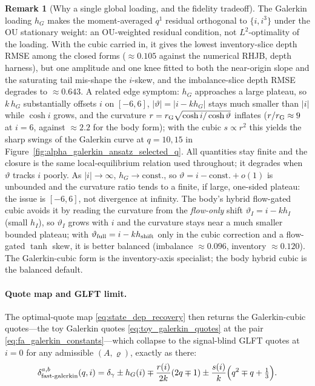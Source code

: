 \documentclass[11pt,a4paper]{article}
\theoremstyle{plain}
\theoremstyle{definition}
\newtheorem{remark}{Remark}[section]
\begin{document}
\begin{remark}[Why a single global loading, and the fidelity tradeoff]
\label{rem:fa_galerkin_tradeoff}
The Galerkin loading \(h_G\) makes the moment-averaged \(q^1\) residual
orthogonal to \(\{i,i^3\}\) under the OU stationary weight: an OU-weighted
residual condition, not \(L^2\)-optimality of the loading.  With the cubic
carried in, it gives the lowest inventory-slice depth RMSE among the closed
forms (\(\approx0.105\) against the numerical RHJB, depth harness), but one
amplitude and one knee fitted to both the near-origin slope and the saturating
tail mis-shape the \(i\)-skew, and the imbalance-slice depth RMSE degrades to
\(\approx0.643\).  A related edge symptom: \(h_G\) approaches a large plateau,
so \(k\,h_G\) substantially offsets \(i\) on \([-6,6]\),
\(|\vartheta|=|i-kh_G|\) stays much smaller than \(|i|\) while \(\cosh i\)
grows, and the curvature \(r=r_{\rm G}\sqrt{\cosh i/\cosh\vartheta}\) inflates
(\(r/r_{\rm G}\approx9\) at \(i=6\), against \(\approx2.2\) for the body
form); with the cubic \(s\propto r^2\) this yields the sharp swings of the
Galerkin curve at \(q=10,15\) in
Figure~\ref{fig:alpha_galerkin_ansatz_selected_q}.  All quantities stay finite
and the closure is the same local-equilibrium relation used throughout; it
degrades when \(\vartheta\) tracks \(i\) poorly.  As \(|i|\to\infty\),
\(h_G\to\mathrm{const.}\), so \(\vartheta=i-\mathrm{const.}+o(1)\) is
unbounded and the curvature ratio tends to a finite, if large, one-sided
plateau: the issue is \([-6,6]\), not divergence at infinity.  The body's
hybrid flow-gated cubic avoids it by reading the curvature from the
\emph{flow-only} shift \(\vartheta_I=i-kh_I\) (small \(h_I\)), so
\(\vartheta_I\) grows with \(i\) and the curvature stays near a much smaller
bounded plateau; with \(\vartheta_{\rm full}=i-kh_{\rm shift}\) only in the
cubic correction and a flow-gated \(\tanh\) skew, it is better balanced
(imbalance \(\approx0.096\), inventory \(\approx0.120\)).  The Galerkin-cubic
form is the inventory-axis specialist; the body hybrid cubic is the balanced
default.
\end{remark}

\paragraph{Quote map and GLFT limit.}
The optimal-quote map \eqref{eq:state_dep_recovery} then returns the
Galerkin-cubic quotes---the toy Galerkin quotes \eqref{eq:toy_galerkin_quotes}
at the pair \eqref{eq:fa_galerkin_constants}---which collapse to the
signal-blind GLFT quotes at \(i=0\) for any admissible \((A,\varrho)\),
exactly as there:
\begin{equation}
\delta_{\rm fast\text{-}galerkin}^{a,b}(q,i)
=\delta_\gamma\pm h_G(i)\mp\frac{r(i)}{2k}(2q\mp1)
\pm\frac{s(i)}{k}\Bigl(q^2\mp q+\tfrac13\Bigr).
\label{eq:fa_galerkin_quotes}
\end{equation}
\end{document}
